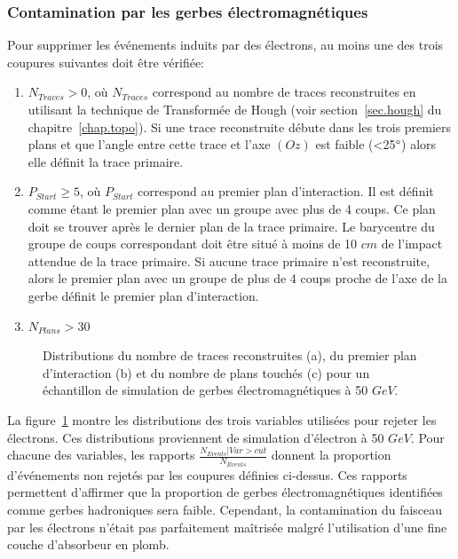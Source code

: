 \subsubsection{Contamination par les gerbes électromagnétiques}
Pour supprimer les événements induits par des électrons, au moins une des trois coupures suivantes doit être vérifiée:
\begin{enumerate}[-]
\item $N_{Traces}>0$, où $N_{Traces}$ correspond au nombre de traces reconstruites en utilisant la technique de Transformée de Hough (voir section~\ref{sec.hough} du chapitre~\ref{chap.topo}). Si une trace reconstruite débute dans les trois premiers plans et que l'angle entre cette trace et l'axe $(Oz)$ est faible (<25$\degree$) alors elle définit la trace primaire. 
\item $P_{Start}\geq5$, où $P_{Start}$ correspond au premier plan d’interaction. Il est définit comme étant le premier plan avec un groupe avec plus de 4 coups. Ce plan doit se trouver après le dernier plan de la trace primaire. Le barycentre du groupe de coups correspondant doit être situé à moins de 10 $cm$ de l'impact attendue de la trace primaire. Si aucune trace primaire n'est reconstruite, alors le premier plan avec un groupe de plus de 4 coups proche de l'axe de la gerbe définit le premier plan d’interaction.
\item $N_{Plans}>30$
\end{enumerate}
\begin{figure}[!ht]
  \caption{Distributions du nombre de traces reconstruites (a), du premier plan d'interaction (b) et du nombre de plans touchés (c) pour un échantillon de simulation de gerbes électromagnétiques à 50 $GeV$.\label{fig:electron_control}}
\end{figure}
La figure~\ref{fig:electron_control} montre les distributions des trois variables utilisées pour rejeter les électrons. Ces distributions proviennent de simulation d'électron à 50 $GeV$. Pour chacune des variables, les rapports $\frac{N_{Events}|Var>cut}{N_{Events}}$ donnent la proportion d'événements non rejetés par les coupures définies ci-dessus. Ces rapports permettent d'affirmer que la proportion de gerbes électromagnétiques identifiées comme gerbes hadroniques sera faible. Cependant, la contamination du faisceau par les électrons n'était pas parfaitement maîtrisée malgré l'utilisation d'une fine couche d'absorbeur en plomb.
